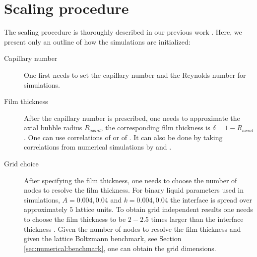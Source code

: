 \documentclass[preprint,12pt]{elsarticle}
\begin{document}
\section{Scaling procedure}
\label{append:scaling}
The scaling procedure is thoroughly described in our previous work \cite{kuzmin-binary2d}. Here, we present
only an outline of how the simulations are initialized:
\begin{description}
 \item[Capillary number] One first needs to set the capillary number and the Reynolds number for
simulations. 
 \item[Film thickness] After the capillary number is prescribed, one needs to approximate the axial
bubble radius $R_{axial}$, the corresponding film thickness is $\delta=1-R_{axial}$. One can use
correlations of \citet{shikazono-square} or of \citet{kreutzer-taylor}. It can also be done by
taking correlations from numerical simulations by
\citet{heil-bretherton} and \citet{giavedoni-numerical}.  
\item[Grid choice] After specifying the film thickness, one needs to choose the
number of nodes to resolve the film thickness. For binary liquid parameters used in simulations,
$A=0.004,0.04$ and $k=0.004,0.04$ the
interface is spread over approximately $5$ lattice units. To obtain grid independent results one
needs to choose the
film thickness to be $2-2.5$ times larger than the interface thickness \cite{kuzmin-binary2d}.
Given the number of nodes to resolve the film thickness and given the lattice Boltzmann
benchmark, see Section \ref{sec:numerical:benchmark}, one can obtain the grid dimensions.


\end{description}
\end{document}

